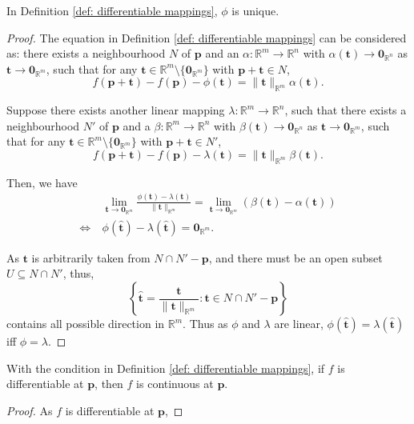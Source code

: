 \begin{theorem}
	\label{thm: differentiable mappings: uniqueness of phi}
	In Definition \ref{def: differentiable mappings}, $\phi$ is unique.
	
	\begin{proof}
		The equation in Definition \ref{def: differentiable mappings} can be considered as: there exists a neighbourhood $N$ of $\mathbf p$ and an $\alpha: \mathbb R^m \to \mathbb R^n$ with $\alpha(\mathbf t) \to \mathbf 0_{\mathbb R^n}$ as $\mathbf t \to \mathbf 0_{\mathbb R^m}$, such that for any $\mathbf t \in \mathbb R^m \setminus \{ \mathbf 0_{\mathbb R^m} \}$ with $\mathbf p + \mathbf t \in N$,
		$$
		f(\mathbf p + \mathbf t) - f(\mathbf p) - \phi(\mathbf t) = \| \mathbf t \|_{\mathbb R^m} \alpha(\mathbf t).
		$$
		
		Suppose there exists another linear mapping $\lambda: \mathbb R^m \to \mathbb R^n$, such that there exists a neighbourhood $N'$ of $\mathbf p$ and a $\beta: \mathbb R^m \to \mathbb R^n$ with $\beta(\mathbf t) \to \mathbf 0_{\mathbb R^n}$ as $\mathbf t \to \mathbf 0_{\mathbb R^m}$, such that for any $\mathbf t \in \mathbb R^m \setminus \{ \mathbf 0_{\mathbb R^m}\}$ with $\mathbf p + \mathbf t \in N'$,
		$$
		f(\mathbf p + \mathbf t) - f(\mathbf p) - \lambda(\mathbf t) = \| \mathbf t \|_{\mathbb R^m} \beta(\mathbf t).
		$$
		
		Then, we have
		$$
		\begin{aligned}
			& \ \lim_{\mathbf t \to \mathbf 0_{\mathbb R^m}} \frac{\phi(\mathbf t) - \lambda(\mathbf t)}{\| \mathbf t \|_{\mathbb R^m}} = \lim_{\mathbf t \to \mathbf 0_{\mathbb R^m}} \left( \beta(\mathbf t) - \alpha(\mathbf t) \right) \\
			\iff & \ \phi (\mathbf{\hat t}) - \lambda (\mathbf{\hat t}) = \mathbf 0_{\mathbb R^m}.
		\end{aligned}
		$$
		
		As $\mathbf t$ is arbitrarily taken from $N \cap N' - \mathbf p$, and there must be an open subset $U \subseteq N \cap N'$, thus,
		$$
		\left\{ \mathbf{\hat t} = \frac{\mathbf t}{\| \mathbf t \|_{\mathbb R^m}} : \mathbf t \in N \cap N' - \mathbf p \right\}
		$$
		contains all possible direction in $\mathbb R^m$. Thus as $\phi$ and $\lambda$ are linear, $\phi(\mathbf{\hat t}) = \lambda(\mathbf{\hat t})$ iff $\phi = \lambda$.
	\end{proof}
\end{theorem}


\begin{theorem}
	With the condition in Definition \ref{def: differentiable mappings}, if $f$ is differentiable at $\mathbf p$, then $f$ is continuous at $\mathbf p$.
	
	\begin{proof}
		As $f$ is differentiable at $\mathbf p$,
	\end{proof}
\end{theorem}



